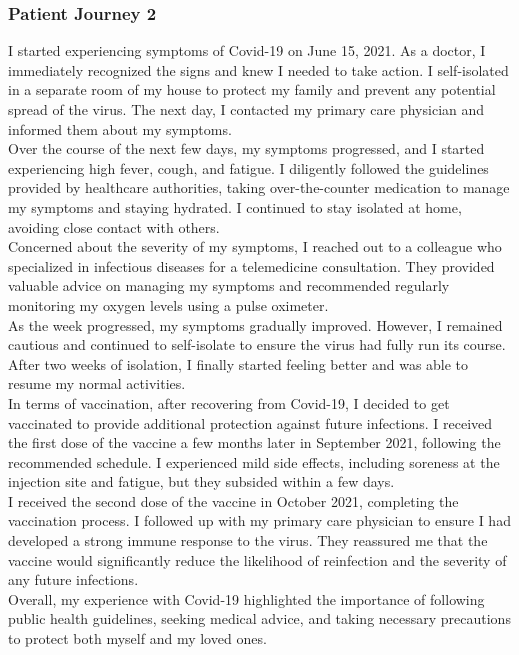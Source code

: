 \subsubsection{Patient Journey 2}\label{apx:pj2}
I started experiencing symptoms of Covid-19 on June 15, 2021. As a doctor, I immediately recognized the signs and knew I needed to take action. I self-isolated in a separate room of my house to protect my family and prevent any potential spread of the virus. The next day, I contacted my primary care physician and informed them about my symptoms.\\
Over the course of the next few days, my symptoms progressed, and I started experiencing high fever, cough, and fatigue. I diligently followed the guidelines provided by healthcare authorities, taking over-the-counter medication to manage my symptoms and staying hydrated. I continued to stay isolated at home, avoiding close contact with others.\\
Concerned about the severity of my symptoms, I reached out to a colleague who specialized in infectious diseases for a telemedicine consultation. They provided valuable advice on managing my symptoms and recommended regularly monitoring my oxygen levels using a pulse oximeter.\\
As the week progressed, my symptoms gradually improved. However, I remained cautious and continued to self-isolate to ensure the virus had fully run its course. After two weeks of isolation, I finally started feeling better and was able to resume my normal activities.\\
In terms of vaccination, after recovering from Covid-19, I decided to get vaccinated to provide additional protection against future infections. I received the first dose of the vaccine a few months later in September 2021, following the recommended schedule. I experienced mild side effects, including soreness at the injection site and fatigue, but they subsided within a few days.\\
I received the second dose of the vaccine in October 2021, completing the vaccination process. I followed up with my primary care physician to ensure I had developed a strong immune response to the virus. They reassured me that the vaccine would significantly reduce the likelihood of reinfection and the severity of any future infections.\\
Overall, my experience with Covid-19 highlighted the importance of following public health guidelines, seeking medical advice, and taking necessary precautions to protect both myself and my loved ones.

